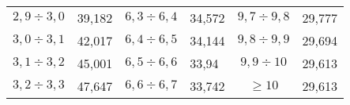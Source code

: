 \begin{table}
\begin{center}
\begin{tabular}{||c|c||c|l||c|l||}
$   2{,}9 \div    3{,}0 $ & 39{,}182  & $ 6{,}3 \div    6{,}4 $ & 34{,}572  & $ 9{,}7 \div    9{,}8 $ & 29{,}777  \\
$   3{,}0 \div    3{,}1 $ & 42{,}017  & $ 6{,}4 \div    6{,}5 $ & 34{,}144  & $ 9{,}8 \div    9{,}9 $ & 29{,}694  \\
$   3{,}1 \div    3{,}2 $ & 45{,}001  & $ 6{,}5 \div    6{,}6 $ & 33{,}94   & $ 9{,}9 \div    10  $ & 29{,}613  \\
$   3{,}2 \div    3{,}3 $ & 47{,}647  & $ 6{,}6 \div    6{,}7 $ & 33{,}742  & $     \geqslant   10  $ & 29{,}613  \\

\hline
\end{tabular}
\end{center}
\end{table}

